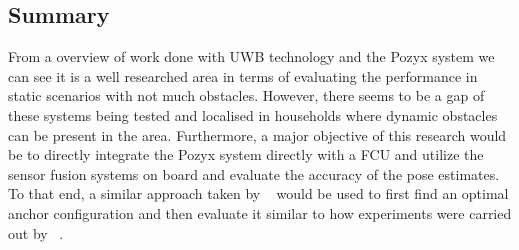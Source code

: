 \subsection{Summary}
From a overview of work done with UWB technology and the Pozyx system we can see it is a well researched area in terms of evaluating the performance in static scenarios with not much obstacles.
However, there seems to be a gap of these systems being tested and localised in households where dynamic obstacles can be present in the area.
Furthermore, a major objective of this research would be to directly integrate the Pozyx system directly with a FCU and utilize the sensor fusion systems on board and evaluate the accuracy of the pose estimates.
To that end, a similar approach taken by ~\citet{di2019evaluation} would be used to first find an optimal anchor configuration and then evaluate it similar to how experiments were carried out by ~\citet{conceiccao2017robot}.